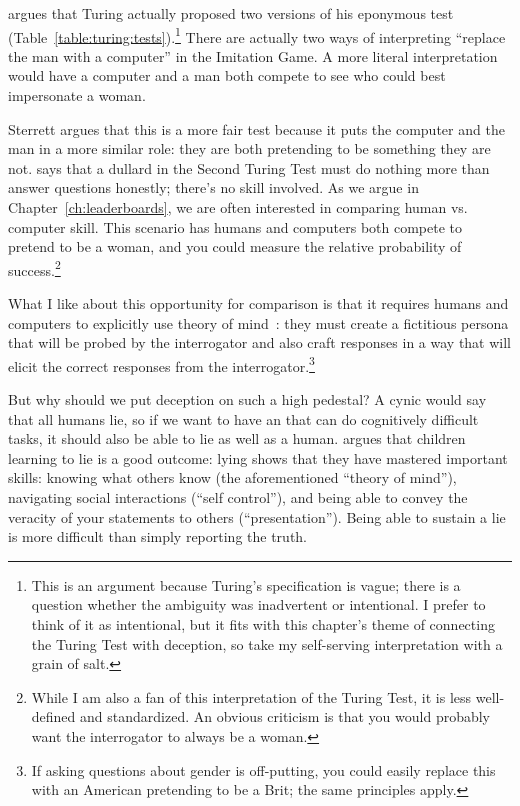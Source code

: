 \citet{Sterrett-00} argues that Turing actually proposed two versions
of his eponymous test (Table~\ref{table:turing:tests}).\footnote{This is an argument because Turing's
  specification is vague; there is a question whether the ambiguity
  was inadvertent or intentional.  I prefer to think of it as
  intentional, but it fits with this chapter's theme of connecting
  the Turing Test with deception, so take my self-serving
  interpretation with a grain of salt.}
%
There are actually two ways of interpreting ``replace the man with a
computer'' in the Imitation Game.
%
A more literal interpretation would have a computer and a man both
compete to see who could best impersonate a woman.

Sterrett argues that this is a more fair test because it puts the
computer and the man in a more similar role: they are both pretending
to be something they are not.
%
\citet{Sterrett-00} says that a dullard in the Second Turing Test must do nothing more
than answer questions honestly; there's no skill involved.
%
As we argue in Chapter~\ref{ch:leaderboards}, we are often interested
in comparing human vs. computer skill.
%
This scenario has humans and computers both compete to pretend to be a
woman, and you could measure the relative probability of
success.\footnote{While I am also a fan of this interpretation of the
  Turing Test, it is less well-defined and standardized.  An obvious
  criticism is that you would probably want the interrogator to always
be a woman.}

What I like about this opportunity for comparison is that it requires
humans and computers to explicitly use theory of mind~\citep{gopnik-88}:
they must create a fictitious persona that will be probed by the
interrogator and also craft responses in a way that will elicit the
correct responses from the interrogator.\footnote{If asking questions
  about gender is off-putting, you could easily replace this with an
  American pretending to be a Brit; the same principles apply.}

But why should we put deception on such a high pedestal?
%
A cynic would say that all humans lie, so if we want to have an 
that can do cognitively difficult tasks, it should also be able to lie as
well as a human.
%
\citet{hendricksen-24} argues that children learning to lie is a
good outcome: lying shows that they have mastered important skills:
knowing what others know (the aforementioned ``theory of mind''),
navigating social interactions (``self control''), and being able to
convey the veracity of your statements to others (``presentation'').
%
Being able to sustain a lie is more difficult than simply reporting
the truth.

